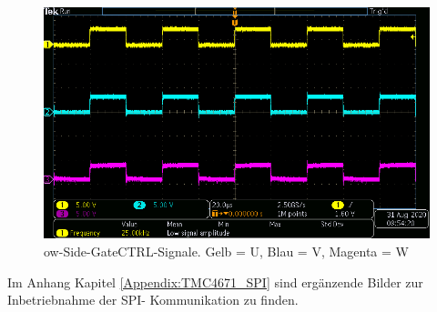 \begin{figure}[H]
\center
\includegraphics[width = \textwidth]{graphics/TMC4671_Gate_Signal_L}
\caption{ow-Side-GateCTRL-Signale. Gelb = U, Blau = V, Magenta = W}
\label{fig:TMC4671_Gate_Signal_L}
\end{figure}

Im Anhang Kapitel \ref{Appendix:TMC4671_SPI} sind ergänzende Bilder zur Inbetriebnahme der SPI- Kommunikation zu finden.